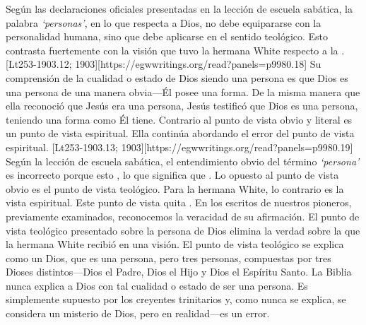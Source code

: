 Según las declaraciones oficiales presentadas en la lección de escuela sabática, la palabra \textit{‘personas’},\textit{ }en lo que respecta a Dios, no debe equipararse con la personalidad humana, sino que debe aplicarse en el sentido teológico. Esto contrasta fuertemente con la visión que tuvo la hermana White respecto a la . [Lt253-1903.12; 1903][https://egwwritings.org/read?panels=p9980.18] Su comprensión de la cualidad o estado de Dios siendo una persona es que Dios es una persona de una manera obvia—Él posee una forma. De la misma manera que ella reconoció que Jesús era una persona, Jesús testificó que Dios es una persona, teniendo una forma como Él tiene. Contrario al punto de vista obvio y literal es un punto de vista espiritual. Ella continúa abordando el error del punto de vista espiritual. [Lt253-1903.13; 1903][https://egwwritings.org/read?panels=p9980.19] Según la lección de escuela sabática, el entendimiento obvio del término \textit{‘persona’ }es incorrecto porque esto , lo que significa que . Lo opuesto al punto de vista obvio es el punto de vista teológico. Para la hermana White, lo contrario es la vista espiritual. Este punto de vista quita . En los escritos de nuestros pioneros, previamente examinados, reconocemos la veracidad de su afirmación. El punto de vista teológico presentado sobre la persona de Dios elimina la verdad sobre la  que la hermana White recibió en una visión. El punto de vista teológico se explica como un Dios, que es una persona, pero tres personas, compuestas por tres Dioses distintos—Dios el Padre, Dios el Hijo y Dios el Espíritu Santo. La Biblia nunca explica a Dios con tal cualidad o estado de ser una persona. Es simplemente supuesto por los creyentes trinitarios y, como nunca se explica, se considera un misterio de Dios, pero en realidad—es un error.


